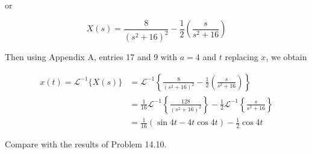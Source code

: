 \documentclass[10pt]{article}
\begin{document}
or

$$
X(s)=\frac{8}{\left(s^{2}+16\right)^{2}}-\frac{1}{2}\left(\frac{s}{s^{2}+16}\right)
$$

Then using Appendix A, entries 17 and 9 with $a=4$ and $t$ replacing $x$, we obtain

$$
\begin{aligned}
x(t)=\mathscr{L}^{-1}\{X(s)\} & =\mathscr{L}^{-1}\left\{\frac{8}{\left(s^{2}+16\right)^{2}}-\frac{1}{2}\left(\frac{s}{s^{2}+16}\right)\right\} \\
& =\frac{1}{16} \mathscr{L}^{-1}\left\{\frac{128}{\left(s^{2}+16\right)^{2}}\right\}-\frac{1}{2} \mathscr{L}^{-1}\left\{\frac{s}{s^{2}+16}\right\} \\
& =\frac{1}{16}(\sin 4 t-4 t \cos 4 t)-\frac{1}{2} \cos 4 t
\end{aligned}
$$

Compare with the results of Problem 14.10.
\end{document}

